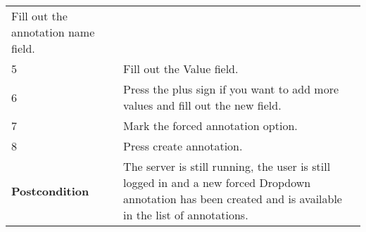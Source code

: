 \begin{longtable}[c]{@{}ll@{}}
\begin{minipage}[t]{0.63\columnwidth}\raggedright\strut
Fill out the annotation name field.
\strut\end{minipage}\tabularnewline
\begin{minipage}[t]{0.31\columnwidth}\raggedright\strut
5
\strut\end{minipage} &
\begin{minipage}[t]{0.63\columnwidth}\raggedright\strut
Fill out the Value field.
\strut\end{minipage}\tabularnewline
\begin{minipage}[t]{0.31\columnwidth}\raggedright\strut
6
\strut\end{minipage} &
\begin{minipage}[t]{0.63\columnwidth}\raggedright\strut
Press the plus sign if you want to add more values and fill out the new
field.
\strut\end{minipage}\tabularnewline
\begin{minipage}[t]{0.31\columnwidth}\raggedright\strut
7
\strut\end{minipage} &
\begin{minipage}[t]{0.63\columnwidth}\raggedright\strut
Mark the forced annotation option.
\strut\end{minipage}\tabularnewline
\begin{minipage}[t]{0.31\columnwidth}\raggedright\strut
8
\strut\end{minipage} &
\begin{minipage}[t]{0.63\columnwidth}\raggedright\strut
Press create annotation.
\strut\end{minipage}\tabularnewline
\begin{minipage}[t]{0.31\columnwidth}\raggedright\strut
\textbf{Postcondition}
\strut\end{minipage} &
\begin{minipage}[t]{0.63\columnwidth}\raggedright\strut
The server is still running, the user is still logged in and a new
forced Dropdown annotation has been created and is available in the list
of annotations.
\strut\end{minipage}\tabularnewline
\bottomrule
\end{longtable}


